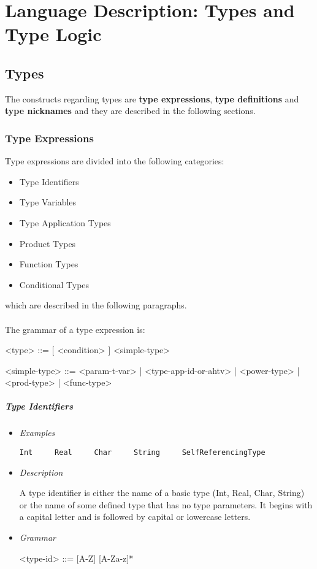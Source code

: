 \documentclass[diploma]{softlab-thesis}
\begin{document}
\chapter{Language Description: Types and Type Logic}

\section{Types}
\label{subsec:types}

The constructs regarding types are \textbf{type expressions}, \textbf{type
definitions} and \textbf{type nicknames} and they are described in the
following sections.

\subsection{Type Expressions}

Type expressions are divided into the following categories:
\begin{itemize}
\item Type Identifiers
\item Type Variables
\item Type Application Types
\item Product Types
\item Function Types
\item Conditional Types
\end{itemize}
which are described in the following paragraphs.
\\\\
The grammar of a type expression is:
\begin{grammar}
<type> ::= [ <condition> ]  <simple-type>

<simple-type> ::=
<param-t-var> | <type-app-id-or-ahtv> | <power-type> | <prod-type> |
<func-type>
\end{grammar}

\paragraph{Type Identifiers}

\begin{itemize}
\item \textit{Examples}
\begin{verbatim}
Int     Real     Char     String     SelfReferencingType
\end{verbatim}

\item \textit{Description}

A type identifier is either the name of a basic type (Int, Real, Char, String)
or the name of some defined type that has no type parameters. It begins with a
capital letter and is followed by capital or lowercase letters.

\item \textit{Grammar}
\begin{grammar}
<type-id> ::= [A-Z] [A-Za-z]*
\end{grammar}
\end{itemize}
\end{document}
